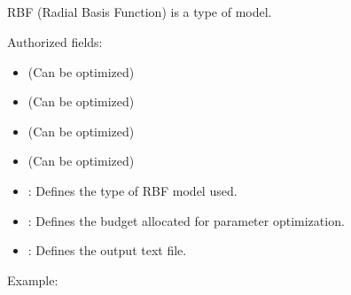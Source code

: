 \documentclass[letterpaper,10pt,english]{sphinxmanual}
\begin{document}
\subsection{}
\label{\detokenize{SgteLib:rbf}}\label{\detokenize{SgteLib:id4}}
\begin{DUlineblock}{0em}
\item[] RBF (Radial Basis Function) is a type of model.
\item[] Authorized fields:
\end{DUlineblock}
\begin{itemize}
\item {} 
\sphinxAtStartPar
{\hyperref[\detokenize{SgteLib:kernel-type}]{}} (Can be optimized)

\item {} 
\sphinxAtStartPar
{\hyperref[\detokenize{SgteLib:kernel-shape}]{}} (Can be optimized)

\item {} 
\sphinxAtStartPar
{\hyperref[\detokenize{SgteLib:distance-type}]{}} (Can be optimized)

\item {} 
\sphinxAtStartPar
{\hyperref[\detokenize{SgteLib:ridge}]{}} (Can be optimized)

\item {} 
\sphinxAtStartPar
{\hyperref[\detokenize{SgteLib:preset}]{}}: Defines the type of RBF model used.

\item {} 
\sphinxAtStartPar
{\hyperref[\detokenize{SgteLib:budget}]{}}: Defines the budget allocated for parameter optimization.

\item {} 
\sphinxAtStartPar
{\hyperref[\detokenize{SgteLib:output}]{}}: Defines the output text file.

\end{itemize}

\begin{DUlineblock}{0em}
\item[] Example:
\item[] 
\end{DUlineblock}
\end{document}
